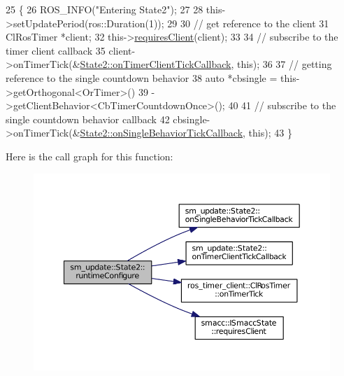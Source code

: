 \begin{DoxyCode}
25     \{
26         ROS\_INFO(\textcolor{stringliteral}{"Entering State2"});
27 
28         this->setUpdatePeriod(ros::Duration(1));
29 
30         \textcolor{comment}{// get reference to the client}
31         ClRosTimer *client;
32         this->\hyperlink{classsmacc_1_1ISmaccState_a7f95c9f0a6ea2d6f18d1aec0519de4ac}{requiresClient}(client);
33 
34         \textcolor{comment}{// subscribe to the timer client callback}
35         client->onTimerTick(&\hyperlink{structsm__update_1_1State2_a217fac4964c4905921e215805f8b80be}{State2::onTimerClientTickCallback}, \textcolor{keyword}{this});
36 
37         \textcolor{comment}{// getting reference to the single countdown behavior}
38         \textcolor{keyword}{auto} *cbsingle = this->getOrthogonal<OrTimer>()
39                              ->getClientBehavior<CbTimerCountdownOnce>();
40 
41         \textcolor{comment}{// subscribe to the single countdown behavior callback}
42         cbsingle->onTimerTick(&\hyperlink{structsm__update_1_1State2_a652c5a4944bcff8dcb237937b340b7dd}{State2::onSingleBehaviorTickCallback}, \textcolor{keyword}{
      this});
43     \}
\end{DoxyCode}


Here is the call graph for this function\+:
\nopagebreak
\begin{figure}[H]
\begin{center}
\leavevmode
\includegraphics[width=350pt]{structsm__update_1_1State2_a4b85c8a77894cc78f017da0de9e2bfa3_cgraph}
\end{center}
\end{figure}


